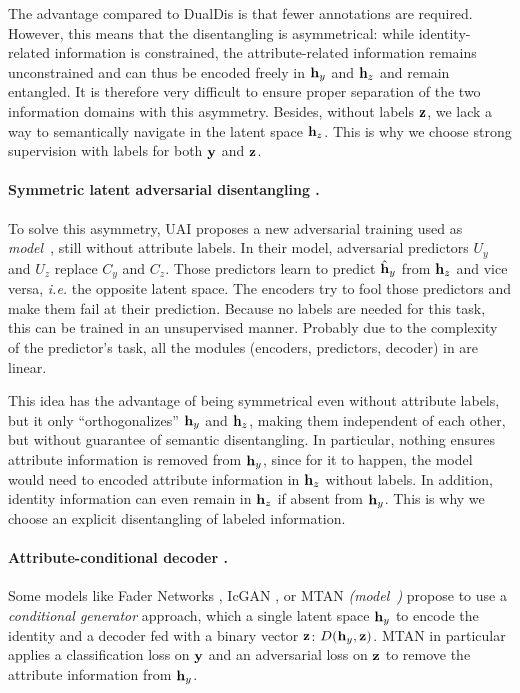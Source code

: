 The advantage compared to DualDis is that fewer annotations are required. However, this means that the disentangling is asymmetrical: while identity-related information is constrained, the attribute-related information remains unconstrai\-ned and can thus be encoded freely in $\mathbf{h}_y$ and $\mathbf{h}_z$ and remain entangled. It is therefore very difficult to ensure proper separation of the two information domains with this asymmetry. Besides, without labels $\mathbf{z}$, we lack a way to semantically navigate in the latent space $\mathbf{h}_z$. This is why we choose strong supervision with labels for both $\mathbf{y}$ and $\mathbf{z}$.

\paragraph{Symmetric latent adversarial disentangling \UAIref.}

To solve this asymmetry, UAI \citep{Jaiswal2018} proposes a new adversarial training used as \textit{model~\UAIref}, still without attribute labels. In their model, adversarial predictors $U_y$ and $U_z$ replace $C_y$ and $C_z$. Those predictors learn to predict $\hat{\mathbf{h}}_y$ from $\mathbf{h}_z$ and vice versa, \textit{i.e.} the opposite latent space. The encoders try to fool those predictors and make them fail at their prediction. Because no labels are needed for this task, this can be trained in an unsupervised manner. Probably due to the complexity of the predictor's task, all the modules (encoders, predictors, decoder) in \citet{Jaiswal2018} are linear.

This idea has the advantage of being symmetrical even without attribute labels, but it only ``orthogonalizes'' $\mathbf{h}_y$ and $\mathbf{h}_z$, making them independent of each other, but without guarantee of semantic disentangling. In particular, nothing ensures attribute information is removed from $\mathbf{h}_y$, since for it to happen, the model would need to encoded attribute information in $\mathbf{h}_z$ without labels. In addition, identity information can even remain in $\mathbf{h}_z$ if absent from $\mathbf{h}_y$. This is why we choose an explicit disentangling of labeled information.

\paragraph{Attribute-conditional decoder \MTANref.} Some models like Fader Networks \citep{Lample2017}, IcGAN \citep{perarnau2016invertible}, or MTAN \citep{Liu2018} \textit{(model~\MTANref)} propose to use a \textit{conditional generator} approach, which a single latent space $\mathbf{h}_y$ to encode the identity and a decoder fed with a binary vector $\mathbf{z}$: $D(\mathbf{h}_y, \mathbf{z})$. MTAN in particular applies a classification loss on $\mathbf{y}$ and an adversarial loss on $\mathbf{z}$ to remove the attribute information from $\mathbf{h}_y$.


